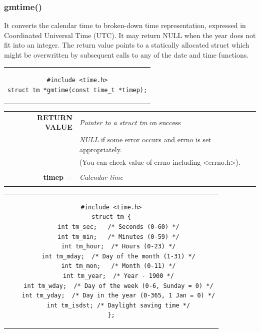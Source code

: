 \subsubsection{gmtime()}
It converts the calendar time to broken-down time representation, expressed in Coordinated Universal Time (UTC). It may return NULL when the year does not fit into an integer.  The return value points to a statically  allocated struct which might be overwritten by subsequent calls to any of the date and time functions.
\begin{center}
\begin{tabular}{c}
\begin{lstlisting}[linewidth=200pt, basicstyle=\footnotesize\sffamily,]
#include <time.h>
struct tm *gmtime(const time_t *timep);
\end{lstlisting}
\end{tabular}
\end{center}

\begin{table}[H]
\centering\footnotesize
\begin{tabular}{rl}
\textbf{RETURN VALUE} & {\textit{Pointer to a struct tm} on success}\\
{} & {\textit{NULL} if some error occurs and errno is set appropriately.}\\
{} & {(You can check value of errno including <errno.h>).}\\
& \\
\textbf{timep =} & {\textit{Calendar time}}\\
& \\
\end{tabular}
\end{table}

\begin{center}
\begin{tabular}{c}
\begin{lstlisting}[linewidth=300pt, basicstyle=\footnotesize\sffamily,]
#include <time.h>
struct tm {
	int tm_sec;   /* Seconds (0-60) */
	int tm_min;   /* Minutes (0-59) */
	int tm_hour;  /* Hours (0-23) */
	int tm_mday;  /* Day of the month (1-31) */
	int tm_mon;   /* Month (0-11) */
	int tm_year;  /* Year - 1900 */
	int tm_wday;  /* Day of the week (0-6, Sunday = 0) */
	int tm_yday;  /* Day in the year (0-365, 1 Jan = 0) */
	int tm_isdst; /* Daylight saving time */
};
\end{lstlisting}
\end{tabular}
\end{center}


